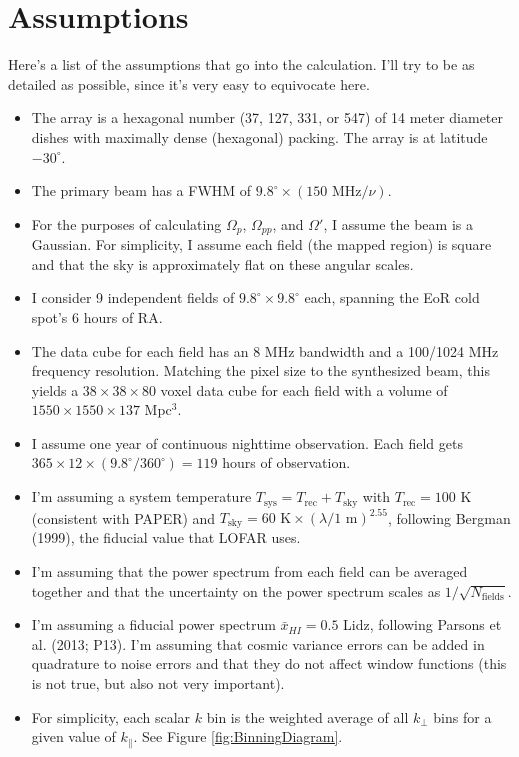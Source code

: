 \documentclass[]{article}
\begin{document}
\section{Assumptions}
Here's a list of the assumptions that go into the calculation.  I'll try to be as detailed as possible, since it's very easy to equivocate here.
\begin{itemize}
\item The array is a hexagonal number (37, 127, 331, or 547) of 14 meter diameter dishes with maximally dense (hexagonal) packing.  The array is at latitude $-30^\circ$.
\item The primary beam has a FWHM of $9.8^\circ \times (150\mbox{ MHz} / \nu)$.
\item For the purposes of calculating $\Omega_p$, $\Omega_{pp}$, and $\Omega'$, I assume the beam is a Gaussian.  For simplicity, I assume each field (the mapped region) is square and that the sky is approximately flat on these angular scales.
\item I consider 9 independent fields of $9.8^\circ \times 9.8^\circ$ each, spanning the EoR cold spot's 6 hours of RA.  
\item The data cube for each field has an 8 MHz bandwidth and a 100/1024 MHz frequency resolution.  Matching the pixel size to the synthesized beam, this yields a $38 \times 38 \times 80$ voxel data cube for each field with a volume of $1550 \times 1550 \times 137$ Mpc$^3$.
\item I assume one year of continuous nighttime observation.  Each field gets $365 \times 12 \times (9.8^\circ / 360^\circ) = 119$ hours of observation.
\item I'm assuming a system temperature $T_\text{sys} = T_\text{rec} + T_\text{sky}$ with $T_\text{rec} = 100 \mbox{ K}$ (consistent with PAPER) and $T_\text{sky} = 60 \mbox{ K} \times (\lambda / 1\mbox{ m})^{2.55}$, following Bergman (1999), the fiducial value that LOFAR uses.
\item I'm assuming that the power spectrum from each field can be averaged together and that the uncertainty on the power spectrum scales as $1/\sqrt{N_\text{fields}}$.
\item I'm assuming a fiducial power spectrum $\bar{x}_{HI} = 0.5$ Lidz, following Parsons et al. (2013; P13).  I'm assuming that cosmic variance errors can be added in quadrature to noise errors and that they do not affect window functions (this is not true, but also not very important).
\item For simplicity, each scalar $k$ bin is the weighted average of all $k_\perp$ bins for a given value of $k_\|$.  See Figure \ref{fig:BinningDiagram}.

\end{itemize}
\end{document}
